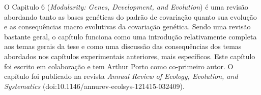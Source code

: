 \begin{refsection}
O Capitulo 6 (\textit{Modularity: Genes, Development, and Evolution}) é uma
revisão abordando tanto as bases genéticas do padrão de covariação quanto sua
evolução e as consequências macro evolutivas da covariação genética. Sendo uma
revisão bastante geral, o capítulo funciona como uma introdução relativamente
completa aos temas gerais da tese e como uma discussão das consequências dos
temas abordados nos capítulos experimentais anteriores, mais específicos. Este
capítulo foi escrito em colaboração e tem Arthur Porto como co-primeiro autor.
O capítulo foi publicado na revista \textit{Annual Review of Ecology,
Evolution, and Systematics} (doi:10.1146/annurev-ecolsys-121415-032409).



\printbibliography


\end{refsection}